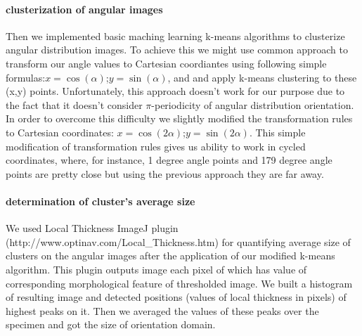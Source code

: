 \paragraph{clusterization of angular images}
Then we implemented basic maching learning k-means algorithms to clusterize angular distribution images.
To achieve this we might use common approach to transform our angle values to Cartesian coordiantes using following simple formulas:$x=\cos(\alpha)$;$y=\sin(\alpha)$, and and apply k-means clustering to these (x,y) points.
Unfortunately, this approach doesn't work for our purpose due to the fact that it doesn't consider $\pi$-periodicity of angular distribution orientation.
In order to overcome this difficulty we slightly modified the transformation rules to Cartesian coordinates: $x=\cos(2\alpha)$;$y=\sin(2\alpha)$.
This simple modification of transformation rules  gives us ability to work in cycled coordinates, where, for instance, 1 degree angle points and 179 degree angle points are pretty close but using the previous approach they are far away.     
\paragraph{determination of cluster's average size}
We used Local Thickness ImageJ plugin (http://www.optinav.com/Local\_Thickness.htm) for quantifying average size of clusters on the angular images after the application of our modified k-means algorithm.
This plugin outputs image each pixel of which has value of corresponding morphological feature of thresholded image.
We built a  histogram of resulting image and detected positions (values of local thickness in pixels) of highest peaks on it.
Then we averaged the values of these peaks over the specimen and got the size of orientation domain.  